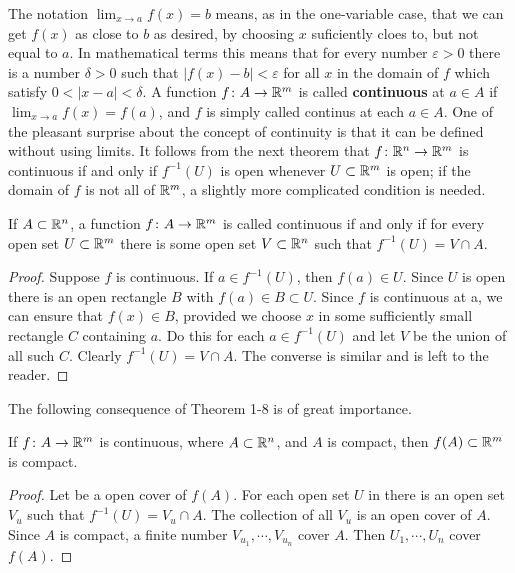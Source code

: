 The notation $\lim_{x\to a}{f(x)} = b$ means, as in the one-variable case, that we can get $f(x)$ as close to $b$
as desired, by choosing $x$ suficiently cloes to, but not equal to $a$. In mathematical terms this means that 
for every number $\varepsilon >0$ there is a number $\delta >0$ such that $|f(x)-b|<\varepsilon$ for all $x$ in 
the domain of $f$ which satisfy $0<|x-a|<\delta$. A function $f\colon{}A\to \mathbb{R}^m$ is called \textbf{continuous} at 
$a\in A$ if $\lim_{x\to a }{f(x)} = f(a)$, and $f$ is simply called continus at each $a\in A$. One of the pleasant
surprise about the concept of continuity is that it can be defined without using limits. It follows from the 
next theorem that $f\colon{}\mathbb{R}^n\to \mathbb{R}^m$ is continuous if and only if $f^{-1}(U)$ is open whenever $U\subset \mathbb{R}^m$
is open; if the domain of $f$ is not all of $\mathbb{R}^m$, a slightly more complicated condition is needed.

\begin{theorem}
    If $A\subset \mathbb{R}^n$, a function $f\colon{}A\to \mathbb{R}^m$ is called continuous if and only if 
    for every open set $U\subset \mathbb{R}^m$ there is some open set $V\subset \mathbb{R}^n$ such that $f^{-1}(U) = V\cap A$.
\end{theorem}

\begin{proof}
    Suppose $f$ is continuous. If $a\in f^{-1}(U)$, then $f(a)\in U$. Since $U$ is open there is an open rectangle
    $B$ with $f(a)\in B\subset U$. Since $f$ is continuous at a, we can ensure that $f(x)\in B$, provided we choose 
    $x$ in some sufficiently small rectangle $C$ containing $a$. Do this for each $a\in f^{-1}(U)$ and let $V$ be the 
    union of all such $C$. Clearly $f^{-1}(U) = V\cap A$. The converse is similar and is left to the reader.
\end{proof}

The following consequence of Theorem 1-8 is of great importance. 

\begin{theorem}
    If $f\colon{}A\to \mathbb{R}^m$ is continuous, where $A\subset \mathbb{R}^n$, and $A$ is compact, then 
    $f(A) \subset \mathbb{R}^m$ is compact.
\end{theorem}

\begin{proof}
    Let  be a open cover of $f(A)$. For each open set $U$ in  there is an open set $V_u$ such that 
    $f^{-1}(U) = V_u\cap A$. The collection of all $V_u$ is an open cover of $A$. Since $A$ is compact, a finite 
    number $V_{u_1},\cdots, V_{u_n}$ cover $A$. Then $U_1, \cdots, U_n$ cover $f(A)$.
\end{proof}

